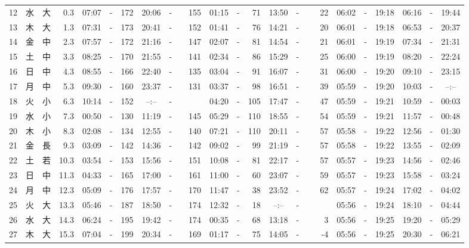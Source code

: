 \documentclass[12pt,a4j]{jsarticle}
\begin{document}
\begin{table}[htbp]
\begin{center}
{\begin{tabular}{|rc|cr|ccrccr|ccrccr|ccc|ccc|}
12 & 水 & 大 &  0.3 &  07:07 &-& 172 &  20:06 &-& 155 &  01:15 &-&  71 &  13:50 &-&  22 & 06:02 & -& 19:18 & 06:16 & -& 19:44 \\
13 & 木 & 大 &  1.3 &  07:31 &-& 173 &  20:41 &-& 152 &  01:41 &-&  76 &  14:21 &-&  20 & 06:01 & -& 19:18 & 06:53 & -& 20:37 \\
14 & 金 & 中 &  2.3 &  07:57 &-& 172 &  21:16 &-& 147 &  02:07 &-&  81 &  14:54 &-&  21 & 06:01 & -& 19:19 & 07:34 & -& 21:31 \\
15 & 土 & 中 &  3.3 &  08:25 &-& 170 &  21:55 &-& 141 &  02:34 &-&  86 &  15:29 &-&  25 & 06:00 & -& 19:19 & 08:20 & -& 22:24 \\
16 & 日 & 中 &  4.3 &  08:55 &-& 166 &  22:40 &-& 135 &  03:04 &-&  91 &  16:07 &-&  31 & 06:00 & -& 19:20 & 09:10 & -& 23:15 \\
17 & 月 & 中 &  5.3 &  09:30 &-& 160 &  23:37 &-& 131 &  03:37 &-&  98 &  16:51 &-&  39 & 05:59 & -& 19:20 & 10:03 & -& --:-- \\
18 & 火 & 小 &  6.3 &  10:14 &-& 152 &  --:-- &-&~~~~~ &  04:20 &-& 105 &  17:47 &-&  47 & 05:59 & -& 19:21 & 10:59 & -& 00:03 \\
19 & 水 & 小 &  7.3 &  00:50 &-& 130 &  11:19 &-& 145 &  05:29 &-& 110 &  18:55 &-&  54 & 05:59 & -& 19:21 & 11:57 & -& 00:48 \\
20 & 木 & 小 &  8.3 &  02:08 &-& 134 &  12:55 &-& 140 &  07:21 &-& 110 &  20:11 &-&  57 & 05:58 & -& 19:22 & 12:56 & -& 01:30 \\
21 & 金 & 長 &  9.3 &  03:09 &-& 142 &  14:36 &-& 142 &  09:02 &-&  99 &  21:19 &-&  57 & 05:58 & -& 19:22 & 13:55 & -& 02:09 \\
22 & 土 & 若 & 10.3 &  03:54 &-& 153 &  15:56 &-& 151 &  10:08 &-&  81 &  22:17 &-&  57 & 05:57 & -& 19:23 & 14:56 & -& 02:46 \\
23 & 日 & 中 & 11.3 &  04:33 &-& 165 &  17:00 &-& 161 &  11:00 &-&  60 &  23:07 &-&  59 & 05:57 & -& 19:23 & 15:58 & -& 03:24 \\
24 & 月 & 中 & 12.3 &  05:09 &-& 176 &  17:57 &-& 170 &  11:47 &-&  38 &  23:52 &-&  62 & 05:57 & -& 19:24 & 17:02 & -& 04:02 \\
25 & 火 & 大 & 13.3 &  05:46 &-& 187 &  18:50 &-& 174 &  12:32 &-&  18 &  --:-- &-&~~~~~ & 05:56 & -& 19:24 & 18:10 & -& 04:44 \\
26 & 水 & 大 & 14.3 &  06:24 &-& 195 &  19:42 &-& 174 &  00:35 &-&  68 &  13:18 &-&   3 & 05:56 & -& 19:25 & 19:20 & -& 05:29 \\
27 & 木 & 大 & 15.3 &  07:04 &-& 199 &  20:34 &-& 169 &  01:17 &-&  75 &  14:05 &-&  -4 & 05:56 & -& 19:25 & 20:30 & -& 06:21 \\

\end{tabular}}
\end{center}
\end{table}
\end{document}
